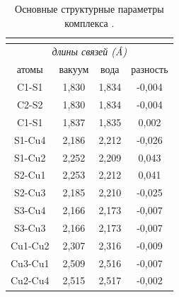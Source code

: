 \documentclass[a4paper,12pt]{article}
\begin{document}
\begin{onehalfspace}
	\begin{table}[H]
		\caption{Основные структурные параметры комплекса .}
		\label{tab3}
		\centering
		\begin{tabular}{|cccc|}
			\hline
			\multicolumn{4}{|c|}{\textbf{\ce{[Cu4(SCH3)3]^{-1}}}}                                                                \\ \hline
			\multicolumn{4}{|c|}{\textit{длины связей (Å)}}                                                     \\ \hline
			\multicolumn{1}{|c|}{атомы}   & \multicolumn{1}{c|}{вакуум} & \multicolumn{1}{c|}{вода}  & разность \\ \hline
			\multicolumn{1}{|c|}{C1-S1}   & \multicolumn{1}{c|}{1,830}  & \multicolumn{1}{c|}{1,834} & -0,004   \\ \hline
			\multicolumn{1}{|c|}{C2-S2}   & \multicolumn{1}{c|}{1,830}  & \multicolumn{1}{c|}{1,834} & -0,004   \\ \hline
			\multicolumn{1}{|c|}{C1-S1}   & \multicolumn{1}{c|}{1,837}  & \multicolumn{1}{c|}{1,835} & 0,002    \\ \hline
			\multicolumn{1}{|c|}{S1-Cu4}  & \multicolumn{1}{c|}{2,186}  & \multicolumn{1}{c|}{2,212} & -0,026   \\ \hline
			\multicolumn{1}{|c|}{S1-Cu2}  & \multicolumn{1}{c|}{2,252}  & \multicolumn{1}{c|}{2,209} & 0,043    \\ \hline
			\multicolumn{1}{|c|}{S2-Cu1}  & \multicolumn{1}{c|}{2,253}  & \multicolumn{1}{c|}{2,212} & 0,041    \\ \hline
			\multicolumn{1}{|c|}{S2-Cu3}  & \multicolumn{1}{c|}{2,185}  & \multicolumn{1}{c|}{2,210} & -0,025   \\ \hline
			\multicolumn{1}{|c|}{S3-Cu4}  & \multicolumn{1}{c|}{2,166}  & \multicolumn{1}{c|}{2,173} & -0,007   \\ \hline
			\multicolumn{1}{|c|}{S3-Cu3}  & \multicolumn{1}{c|}{2,166}  & \multicolumn{1}{c|}{2,173} & -0,007   \\ \hline
			\multicolumn{1}{|c|}{Cu1-Cu2} & \multicolumn{1}{c|}{2,307}  & \multicolumn{1}{c|}{2,316} & -0,009   \\ \hline
			\multicolumn{1}{|c|}{Cu3-Cu1} & \multicolumn{1}{c|}{2,509}  & \multicolumn{1}{c|}{2,516} & -0,007   \\ \hline
			\multicolumn{1}{|c|}{Cu2-Cu4} & \multicolumn{1}{c|}{2,515}  & \multicolumn{1}{c|}{2,517} & -0,002   \\ \hline
		\end{tabular}
	\end{table}
	

\end{onehalfspace}
\end{document}
